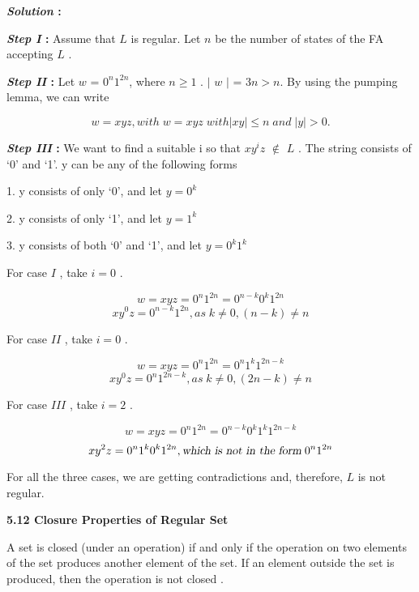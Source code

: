\documentclass[10pt,a4paper]{article}
\begin{document}
\begin{flushleft}
  \textbf{\emph{Solution} :}

\textbf{\emph{Step I} :} Assume that $L$ is regular. Let $n$ be the number of states of the FA accepting $L$ .

\textbf{\emph{Step II} :} Let $w$ = $0^{n} 1^{2n} $, where $ n \geq 1 $ . $|$ $w$ $|$ = $ 3n >n $. By using the pumping lemma, we can write

$$ w = xyz, with \; w = xyz \; with | xy | \leq n \; and \; | y | > 0 . $$

\textbf{\emph{Step III} :} We want to find a suitable \; i\; so that $xy^{i}z$ $\notin$ $L$ . The string consists of ‘0’ and ‘1’. y can be any of the following forms

1. y consists of only ‘0’, and let $y = 0^{k}$

2. y consists of only ‘1’, and let $y = 1^{k}$

3. y consists of both ‘0’ and ‘1’, and let $y = 0^{k} 1^{k}$


For case $I$ , take $i = 0$ .

$$ w = xyz = 0^{n} 1^{2n}= 0^{n-k} 0^{k} 1^{2n} $$
$$ xy^{0}z = 0^{n-k} 1^{2n} , as \; k \neq 0 , (n-k)\neq n $$

For case $II$ , take $i = 0$ .

$$ w = xyz = 0^{n} 1^{2n}= 0^{n} 1^{k} 1^{2n-k} $$
$$ xy^{0}z = 0^{n} 1^{2n-k} , as \; k \neq 0 , (2n-k)\neq n $$

For case $III$ , take $i = 2$ .

$$ w = xyz = 0^{n} 1^{2n}= 0^{n-k} 0^{k} 1^{k} 1^{2n-k} $$
$$ xy^{2}z = 0^{n} 1^{k} 0^{k} 1^{2n} , \textsl{which is not in the form}\; 0^{n} 1^{2n}$$

For all the three cases, we are getting contradictions and, therefore, $L$ is not regular.

\end{flushleft}

\begin{flushleft}
  \textsf{\textbf{5.12 Closure Properties of Regular Set}}

  A set is closed (under an operation) if and only if the operation on two elements of the set produces
another element of the set. If an element outside the set is produced, then the operation is not closed .
\end{flushleft}
\end{document}
